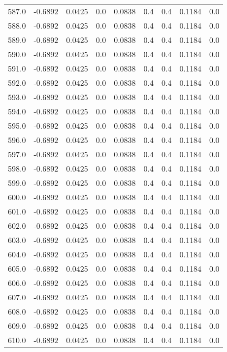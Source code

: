 \begin{longtable}{lrrrrrrrr}
587.0 & -0.6892 & 0.0425 & 0.0 & 0.0838 & 0.4 & 0.4 & 0.1184 & 0.0 \\
588.0 & -0.6892 & 0.0425 & 0.0 & 0.0838 & 0.4 & 0.4 & 0.1184 & 0.0 \\
589.0 & -0.6892 & 0.0425 & 0.0 & 0.0838 & 0.4 & 0.4 & 0.1184 & 0.0 \\
590.0 & -0.6892 & 0.0425 & 0.0 & 0.0838 & 0.4 & 0.4 & 0.1184 & 0.0 \\
591.0 & -0.6892 & 0.0425 & 0.0 & 0.0838 & 0.4 & 0.4 & 0.1184 & 0.0 \\
592.0 & -0.6892 & 0.0425 & 0.0 & 0.0838 & 0.4 & 0.4 & 0.1184 & 0.0 \\
593.0 & -0.6892 & 0.0425 & 0.0 & 0.0838 & 0.4 & 0.4 & 0.1184 & 0.0 \\
594.0 & -0.6892 & 0.0425 & 0.0 & 0.0838 & 0.4 & 0.4 & 0.1184 & 0.0 \\
595.0 & -0.6892 & 0.0425 & 0.0 & 0.0838 & 0.4 & 0.4 & 0.1184 & 0.0 \\
596.0 & -0.6892 & 0.0425 & 0.0 & 0.0838 & 0.4 & 0.4 & 0.1184 & 0.0 \\
597.0 & -0.6892 & 0.0425 & 0.0 & 0.0838 & 0.4 & 0.4 & 0.1184 & 0.0 \\
598.0 & -0.6892 & 0.0425 & 0.0 & 0.0838 & 0.4 & 0.4 & 0.1184 & 0.0 \\
599.0 & -0.6892 & 0.0425 & 0.0 & 0.0838 & 0.4 & 0.4 & 0.1184 & 0.0 \\
600.0 & -0.6892 & 0.0425 & 0.0 & 0.0838 & 0.4 & 0.4 & 0.1184 & 0.0 \\
601.0 & -0.6892 & 0.0425 & 0.0 & 0.0838 & 0.4 & 0.4 & 0.1184 & 0.0 \\
602.0 & -0.6892 & 0.0425 & 0.0 & 0.0838 & 0.4 & 0.4 & 0.1184 & 0.0 \\
603.0 & -0.6892 & 0.0425 & 0.0 & 0.0838 & 0.4 & 0.4 & 0.1184 & 0.0 \\
604.0 & -0.6892 & 0.0425 & 0.0 & 0.0838 & 0.4 & 0.4 & 0.1184 & 0.0 \\
605.0 & -0.6892 & 0.0425 & 0.0 & 0.0838 & 0.4 & 0.4 & 0.1184 & 0.0 \\
606.0 & -0.6892 & 0.0425 & 0.0 & 0.0838 & 0.4 & 0.4 & 0.1184 & 0.0 \\
607.0 & -0.6892 & 0.0425 & 0.0 & 0.0838 & 0.4 & 0.4 & 0.1184 & 0.0 \\
608.0 & -0.6892 & 0.0425 & 0.0 & 0.0838 & 0.4 & 0.4 & 0.1184 & 0.0 \\
609.0 & -0.6892 & 0.0425 & 0.0 & 0.0838 & 0.4 & 0.4 & 0.1184 & 0.0 \\
610.0 & -0.6892 & 0.0425 & 0.0 & 0.0838 & 0.4 & 0.4 & 0.1184 & 0.0 \\

\end{longtable}

